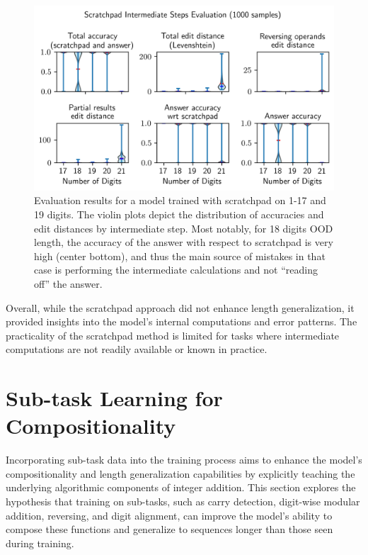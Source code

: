 \begin{figure}[h!]
    \centering
    \includegraphics[width=\textwidth]{fig/scratchpad_eval.png}
    \caption{Evaluation results for a model trained with scratchpad on 1-17 and 19 digits. The violin plots depict the distribution of accuracies and edit distances by intermediate step. Most notably, for 18 digits OOD length, the accuracy of the answer with respect to scratchpad is very high (center bottom), and thus the main source of mistakes in that case is performing the intermediate calculations and not ``reading off'' the answer.}
    \label{fig:scratchpad_eval}
\end{figure}

Overall, while the scratchpad approach did not enhance length generalization, it provided insights into the model's internal computations and error patterns. The practicality of the scratchpad method is limited for tasks where intermediate computations are not readily available or known in practice.

\section{Sub-task Learning for Compositionality}\label{sec:subtask_learning}

Incorporating sub-task data into the training process aims to enhance the model's compositionality and length generalization capabilities by explicitly teaching the underlying algorithmic components of integer addition. This section explores the hypothesis that training on sub-tasks, such as carry detection, digit-wise modular addition, reversing, and digit alignment, can improve the model's ability to compose these functions and generalize to sequences longer than those seen during training.

